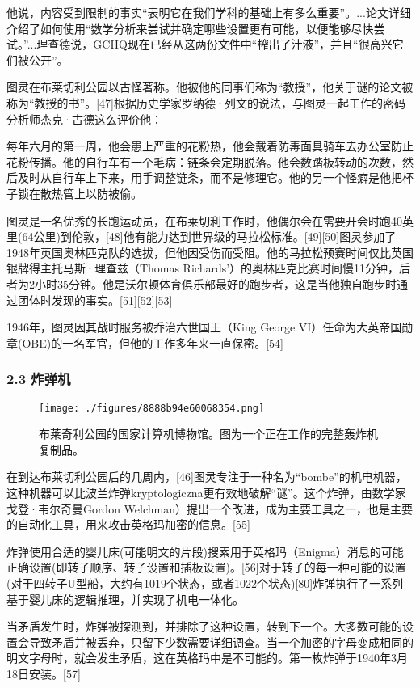 他说，内容受到限制的事实“表明它在我们学科的基础上有多么重要”。...论文详细介绍了如何使用“数学分析来尝试并确定哪些设置更有可能，以便能够尽快尝试。”...理查德说，GCHQ现在已经从这两份文件中“榨出了汁液”，并且“很高兴它们被公开”。

图灵在布莱切利公园以古怪著称。他被他的同事们称为“教授”，他关于谜的论文被称为“教授的书”。[47]根据历史学家罗纳德·列文的说法，与图灵一起工作的密码分析师杰克·古德这么评价他：

每年六月的第一周，他会患上严重的花粉热，他会戴着防毒面具骑车去办公室防止花粉传播。他的自行车有一个毛病：链条会定期脱落。他会数踏板转动的次数，然后及时从自行车上下来，用手调整链条，而不是修理它。他的另一个怪癖是他把杯子锁在散热管上以防被偷。

图灵是一名优秀的长跑运动员，在布莱切利工作时，他偶尔会在需要开会时跑40英里(64公里)到伦敦，[48]他有能力达到世界级的马拉松标准。[49][50]图灵参加了1948年英国奥林匹克队的选拔，但他因受伤而受阻。他的马拉松预赛时间仅比英国银牌得主托马斯·理查兹（Thomas Richards'）的奥林匹克比赛时间慢11分钟，后者为2小时35分钟。他是沃尔顿体育俱乐部最好的跑步者，这是当他独自跑步时通过团体时发现的事实。[51][52][53]

1946年，图灵因其战时服务被乔治六世国王（King George VI）任命为大英帝国勋章(OBE)的一名军官，但他的工作多年来一直保密。[54]
\subsubsection{2.3 炸弹机}
\begin{figure}[ht]
\centering
\texttt{[image: ./figures/8888b94e60068354.png]}
\caption{布莱奇利公园的国家计算机博物馆。图为一个正在工作的完整轰炸机复制品。} \label{fig_ALTL_3}
\end{figure}
在到达布莱切利公园后的几周内，[46]图灵专注于一种名为“bombe”的机电机器，这种机器可以比波兰炸弹kryptologiczna更有效地破解“谜”。这个炸弹，由数学家戈登·韦尔奇曼Gordon Welchman）提出一个改进，成为主要工具之一，也是主要的自动化工具，用来攻击英格玛加密的信息。[55]

炸弹使用合适的婴儿床(可能明文的片段)搜索用于英格玛（Enigma）消息的可能正确设置(即转子顺序、转子设置和插板设置)。[56]对于转子的每一种可能的设置(对于四转子U型船，大约有1019个状态，或者1022个状态)[80]炸弹执行了一系列基于婴儿床的逻辑推理，并实现了机电一体化。

当矛盾发生时，炸弹被探测到，并排除了这种设置，转到下一个。大多数可能的设置会导致矛盾并被丢弃，只留下少数需要详细调查。当一个加密的字母变成相同的明文字母时，就会发生矛盾，这在英格玛中是不可能的。第一枚炸弹于1940年3月18日安装。[57]

